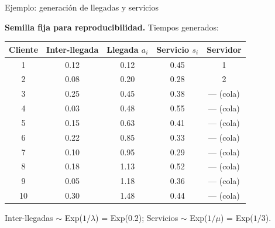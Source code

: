 \documentclass[aspectratio=1610, 9pt]{beamer}
\begin{document}
\begin{frame}{Ejemplo: generación de llegadas y servicios}

\textbf{Semilla fija para reproducibilidad.} Tiempos generados:

\vspace{0.2cm}
\begin{center}
\renewcommand{\arraystretch}{1.2}
\small
\begin{tabular}{ccccc}
\toprule
\textbf{Cliente} & \textbf{Inter-llegada} & \textbf{Llegada $a_i$} & \textbf{Servicio $s_i$} & \textbf{Servidor} \\
\midrule
1 & 0.12 & 0.12 & 0.45 & 1 \\
2 & 0.08 & 0.20 & 0.28 & 2 \\
3 & 0.25 & 0.45 & 0.38 & --- (cola) \\
4 & 0.03 & 0.48 & 0.55 & --- (cola) \\
5 & 0.15 & 0.63 & 0.41 & --- (cola) \\
6 & 0.22 & 0.85 & 0.33 & --- (cola) \\
7 & 0.10 & 0.95 & 0.29 & --- (cola) \\
8 & 0.18 & 1.13 & 0.52 & --- (cola) \\
9 & 0.05 & 1.18 & 0.36 & --- (cola) \\
10 & 0.30 & 1.48 & 0.44 & --- (cola) \\
\bottomrule
\end{tabular}
\end{center}

\vspace{0.2cm}
\small Inter-llegadas $\sim$ Exp($1/\lambda$) = Exp($0.2$); Servicios $\sim$ Exp($1/\mu$) = Exp($1/3$).
\end{frame}



\end{document}

